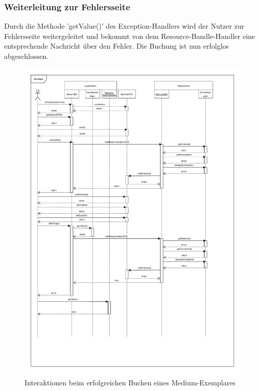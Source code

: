 \documentclass{article}
\begin{document}
\subsubsection{Weiterleitung zur Fehlersseite}
Durch die Methode 'getValue()' des Exception-Handlers wird der Nutzer zur Fehlersseite weitergeleitet und bekommt von dem Resource-Bandle-Handler eine entsprechende Nachricht über den Fehler. Die Buchung ist nun erfolglos abgeschlossen.
\newpage


\begin{figure}[h]
    \centering
    \includegraphics[width = 50em]{Sequenzdiagramm-success-v2}
    \caption{Interaktionen beim erfolgreichen Buchen eines Medium-Exemplares}
    \label{Sequenzdiagramm}
\end{figure}
\end{document}
